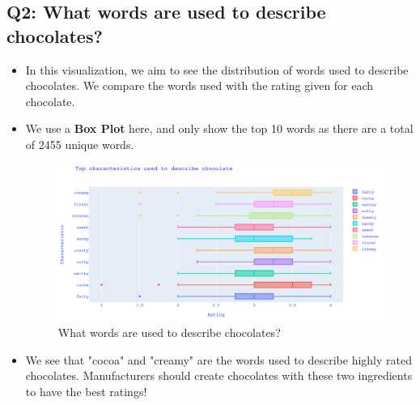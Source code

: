 \documentclass[a4paper]{article}
\begin{document}
\subsection{Q2: What words are used to describe chocolates?}
\begin{itemize}
    \item In this visualization, we aim to see the distribution of words used to describe chocolates. We compare the words used with the rating given for each chocolate.
    \item We use a \textbf{Box Plot} here, and only show the top 10 words as there are a total of 2455 unique words.
    \begin{figure}[H]
        \centering
        \includegraphics[width=1.0\textwidth]{box}
        \caption{What words are used to describe chocolates?}
        \label{fig:box}
    \end{figure}
    \item We see that "cocoa" and "creamy" are the words used to describe highly rated chocolates. Manufacturers should create chocolates with these two ingredients to have the best ratings!
\end{itemize}
\end{document}
